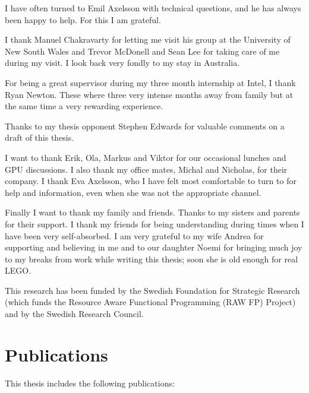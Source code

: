 \documentclass[a4paper]{book}
\begin{document}
I have often turned to Emil Axelsson with technical questions, and he has always been
happy to help. For this I am grateful. 

I thank Manuel Chakravarty for letting me visit his group at the University of New South Wales 
and Trevor McDonell and Sean Lee for taking care of me during my visit. I look back 
very fondly to my stay in Australia. 

For being a great supervisor during my three month internship at Intel, I thank Ryan Newton. 
These where three very intense months away from family but at the same time a very rewarding 
experience. 

Thanks to my thesis opponent Stephen Edwards for valuable comments on a draft of this thesis. 

I want to thank Erik, Ola, Markus and Viktor for our occasional lunches and GPU discussions. 
I also thank my office mates, Michal and Nicholas, for their company. I thank Eva Axelsson, 
who I have felt most comfortable to turn to for help and information, even when she was not 
the appropriate channel. 

Finally I want to thank my family and friends. Thanks to my sisters and parents for their support.
I thank my friends for being understanding during times when I have been very self-absorbed. 
I am very grateful to my wife Andrea for supporting and believing in me and to our daughter Noemi 
for bringing much joy to my breaks from work while writing this thesis; soon she is old enough 
for real LEGO. 

\vspace{5mm}
\noindent This research has been funded by the Swedish Foundation for
Strategic Research (which funds the Resource Aware Functional 
Programming (RAW FP) Project) and by the Swedish Research Council.

\clearpage

\section*{Publications}

This thesis includes the following publications: 
\end{document}
